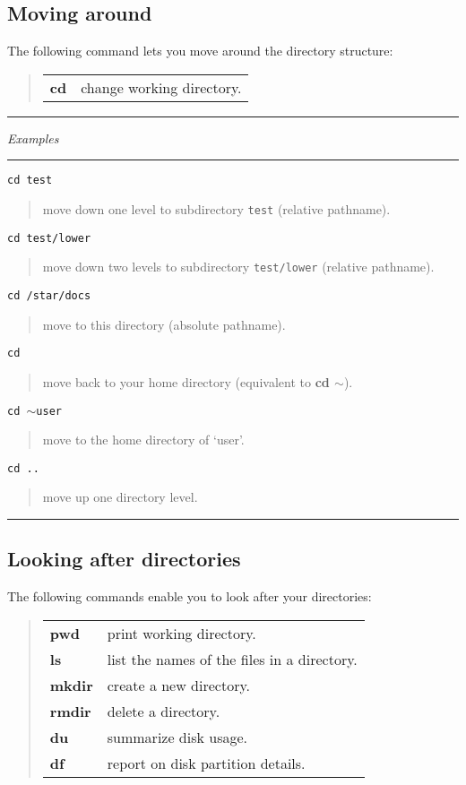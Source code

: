 \documentclass[twoside,11pt,nolof]{starlink}
\providecommand{\example}[2]{\goodbreak
                         \texttt{#1}
                         \vspace*{-4mm}
                         \begin{quote}
                           {\small #2}
                         \end{quote}
                        }
\providecommand{\exbegin}{\begin{center}
                      \rule{18mm}{0.3mm}
                      \emph{Examples}
                      \rule{18mm}{0.3mm}
                      \end{center}
                     }
\providecommand{\exend}{\begin{center}
                    \rule{50mm}{0.3mm}
                    \end{center}
                   }
\begin{document}
\subsection{Moving around}

The following command lets you move around the directory structure:

\begin{quote}
\begin{tabular}{lp{67mm}}

\textbf{cd}  & change working directory.

\end{tabular}
\end{quote}

\goodbreak

\exbegin

\example{cd test}
{move down one level to subdirectory \texttt{test} (relative pathname).}

\example{cd test/lower}
{move down two levels to subdirectory \texttt{test/lower} (relative pathname).}

\example{cd /star/docs}
{move to this directory (absolute pathname).}

\example{cd}
{move back to your home directory (equivalent to \textbf{cd $\sim$}).}

\example{cd $\sim$user}
{move to the home directory of `user'.}

\example{cd ..}
{move up one directory level.}

\exend

\subsection{Looking after directories}

The following commands enable you to look after your directories:

\begin{quote}
\begin{tabular}{lp{67mm}}

\textbf{pwd}   & print working directory.\\
\textbf{ls}    & list the names of the files in a directory.\\
\textbf{mkdir} & create a new directory.\\
\textbf{rmdir} & delete a directory.\\
\textbf{du}    & summarize disk usage.\\
\textbf{df}    & report on disk partition details.

\end{tabular}
\end{quote}
\end{document}

